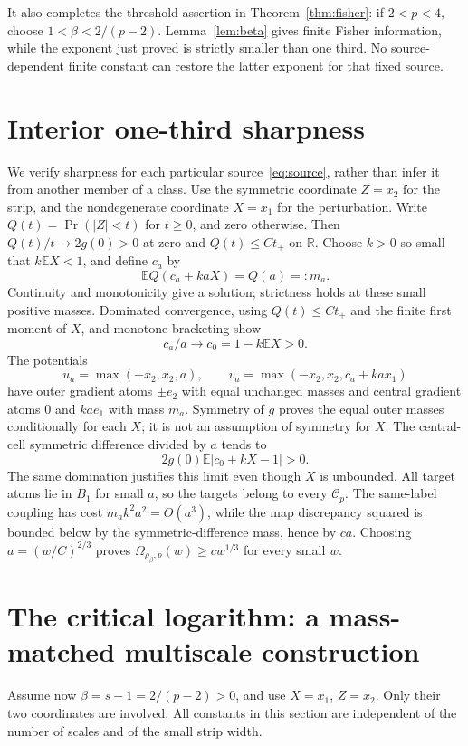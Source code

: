 \documentclass[11pt]{article}
\theoremstyle{remark}\newtheorem{remark}[theorem]{Remark}
\newcommand{\R}{\mathbb R}\newcommand{\E}{\mathbb E}
\begin{document}
It also completes the threshold assertion in Theorem~\ref{thm:fisher}: if $2<p<4$, choose
$1<\beta<2/(p-2)$. Lemma~\ref{lem:beta} gives finite Fisher information, while the exponent just proved is strictly smaller than one third. No source-dependent finite constant can restore the latter exponent for that fixed source.

\section{Interior one-third sharpness}\label{sec:interior}
We verify sharpness for each particular source~\eqref{eq:source}, rather than infer it from another member of a class. Use the symmetric coordinate $Z=x_2$ for the strip, and the nondegenerate coordinate $X=x_1$ for the perturbation. Write $Q(t)=\Pr(|Z|<t)$ for $t\ge0$, and zero otherwise. Then
$Q(t)/t\to2g(0)>0$ at zero and $Q(t)\le C t_+$ on $\R$.
Choose $k>0$ so small that $k\E X<1$, and define $c_a$ by
\[
 \E Q(c_a+kaX)=Q(a)=:m_a.
\]
Continuity and monotonicity give a solution; strictness holds at these small positive masses. Dominated convergence, using $Q(t)\le Ct_+$ and the finite first moment of $X$, and monotone bracketing show
\[
 c_a/a\to c_0=1-k\E X>0.
\]
The potentials
\[
 u_a=\max(-x_2,x_2,a),\qquad
 v_a=\max(-x_2,x_2,c_a+ka x_1)
\]
have outer gradient atoms $\pm e_2$ with equal unchanged masses and central gradient atoms $0$ and $kae_1$ with mass $m_a$. Symmetry of $g$ proves the equal outer masses conditionally for each $X$; it is not an assumption of symmetry for $X$. The central-cell symmetric difference divided by $a$ tends to
\[
 2g(0)\E|c_0+kX-1|>0.
\]
The same domination justifies this limit even though $X$ is unbounded. All target atoms lie in $B_1$ for small $a$, so the targets belong to every $\mathcal C_p$. The same-label coupling has cost $m_a k^2a^2=O(a^3)$, while the map discrepancy squared is bounded below by the symmetric-difference mass, hence by $c a$. Choosing $a=(w/C)^{2/3}$ proves
$\Omega_{\rho_\beta,p}(w)\ge c w^{1/3}$ for every small $w$.

\section{The critical logarithm: a mass-matched multiscale construction}\label{sec:critical}
Assume now $\beta=s-1=2/(p-2)>0$, and use $X=x_1$, $Z=x_2$. Only their two coordinates are involved. All constants in this section are independent of the number of scales and of the small strip width.
\end{document}
